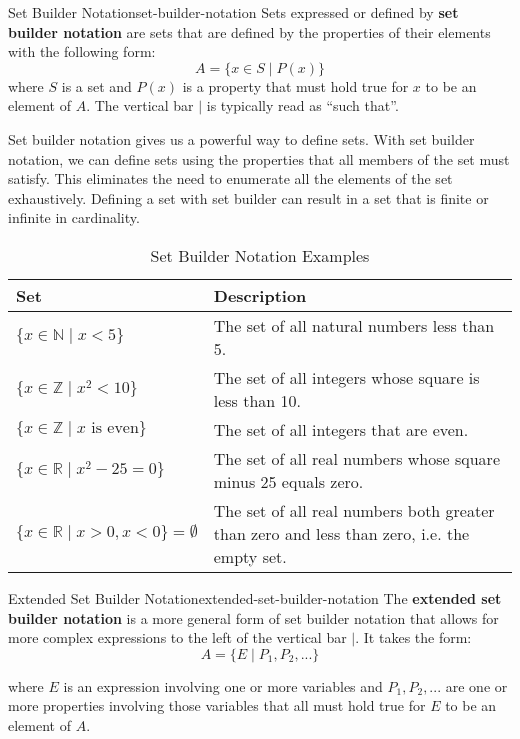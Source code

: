 \begin{definition}{Set Builder Notation}{set-builder-notation}
  Sets expressed or defined by \textbf{set builder notation} are sets that are defined by
  the properties of their elements with the following form:
  \[
    A = \{ x \in S \mid P(x) \}
  \]
  where \( S \) is a set and \( P(x) \) is a property that must hold true for \( x \) to be
  an element of \( A \). The vertical bar \( | \) is typically read as ``such that''.
\end{definition}

Set builder notation gives us a powerful way to define sets. With set builder notation, we can
define sets using the properties that all members of the set must satisfy. This eliminates the
need to enumerate all the elements of the set exhaustively. Defining a set with set builder
can result in a set that is finite or infinite in cardinality.

\begin{table}[H]
  \centering
  \begin{tabular}{p{2in} p{3in}}
    \toprule
    \textbf{Set} & \textbf{Description} \\
    \midrule
    \( \{ x \in \mathbb{N} \mid x < 5 \} \) & The set of all natural numbers less than 5. \\
    \( \{ x \in \mathbb{Z} \mid x^2 < 10 \} \) & The set of all integers whose square is less than 10. \\
    \( \{ x \in \mathbb{Z} \mid x \text{ is even} \} \) & The set of all integers that are even. \\
    \( \{ x \in \mathbb{R} \mid x^2 - 25 = 0\} \) & The set of all real numbers whose square minus 25 equals zero.\\
    \( \{ x \in \mathbb{R} \mid x > 0, x < 0\} = \emptyset \) &
      The set of all real numbers both greater than zero and less than zero, i.e. the empty set.  \\
    \end{tabular}
  \caption{Set Builder Notation Examples}
\end{table}

\begin{definition}{Extended Set Builder Notation}{extended-set-builder-notation}
  The \textbf{extended set builder notation} is a more general form of set builder notation
  that allows for more complex expressions to the left of the vertical bar \( | \).
  It takes the form:
  \[
    A = \{ E \mid P_1, P_2, ... \}
  \]

  where \( E \) is an expression involving one or more variables and \( P_1, P_2, ... \) are
  one or more properties involving those variables that all must hold true for \( E \) to be an
  element of \( A \).
\end{definition}

